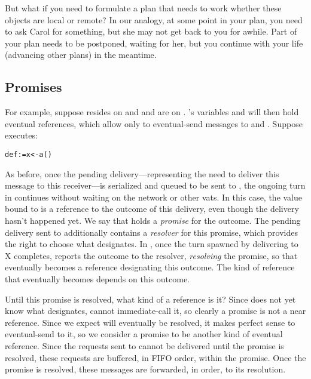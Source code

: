 \documentclass{llncs}
\begin{document}
But what if you need to formulate a plan that needs to work whether
these objects are local or remote? In our analogy,  at some point in your plan, you need to ask Carol for
something, but she may not get back to you for awhile. Part of your
plan needs to be postponed, waiting for her, but you continue with
your life (advancing other plans) in the meantime.

\subsection{Promises}

For example, suppose  resides on  and  and
 are on . 's variables  and  will
then hold eventual references, which allow  only to
eventual-send messages to  and . Suppose 
executes:
%
\begin{alltt}
    def  := x <- a()
\end{alltt}
%
As before, once the pending delivery---representing the need to
deliver this message to this receiver---is serialized and
queued to be sent to , the ongoing turn in  continues
without waiting on the network or other vats. In this case, the value
bound to  is a reference to the outcome of this delivery, even
though the delivery hasn't happened yet. We say that  holds a
\emph{promise} for the outcome. The pending delivery sent to 
additionally contains a \emph{resolver} for this promise, which
provides the right to choose what  designates. In ,
once the turn spawned by delivering  to X completes, 
reports the outcome to the resolver, \emph{resolving} the promise, so
that  eventually becomes a reference designating this
outcome. The kind of reference that  eventually becomes
depends on this outcome.

Until this promise is resolved, what kind of a reference is it? Since
 does not yet know what  designates,  cannot
immediate-call it, so clearly a promise is not a near reference. Since
we expect  will eventually be resolved, it makes perfect sense
to eventual-send to it, so we consider a promise to be another kind of
eventual reference. 
%
%
Since the requests sent to  cannot be delivered until the
promise is resolved, these requests are buffered, in FIFO order,
within the promise. Once the promise is resolved, these messages are
forwarded, in order, to its resolution.
\end{document}
